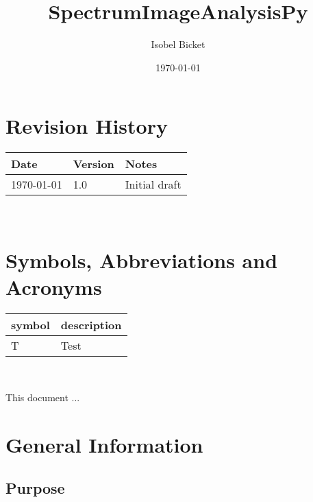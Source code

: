 \documentclass[12pt, titlepage]{article}
\begin{document}

\title{SpectrumImageAnalysisPy} 
\author{Isobel Bicket}
\date{\today}
	
\maketitle


\section{Revision History}

\begin{tabularx}{\textwidth}{p{4cm}p{2cm}X}
\toprule {\bf Date} & {\bf Version} & {\bf Notes}\\
\midrule
\today & 1.0 & Initial draft\\
\bottomrule
\end{tabularx}

~\newpage

\section{Symbols, Abbreviations and Acronyms}

\renewcommand{\arraystretch}{1.2}
\begin{tabular}{l l} 
  \toprule		
  \textbf{symbol} & \textbf{description}\\
  \midrule 
  T & Test\\
  \bottomrule
\end{tabular}\\


\newpage

\tableofcontents

\listoftables

\listoffigures

\newpage


This document ...

\section{General Information}

\subsection{Purpose}
\end{document}
